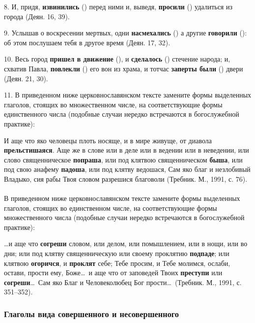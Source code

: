 \documentclass[11pt,a4paper,oneside]{memoir}
\newcommand{\exercise}{}
\begin{document}
8. И, придя, \textbf{извинились} ({}) перед ними и,
выведя, \textbf{просили} ({}) удалиться из города (Деян. 16, 39).

9. Услышав о воскресении мертвых, одни \textbf{насмехались}
({}) а другие \textbf{говорили} ({}): об
этом послушаем тебя в другое время (Деян. 17, 32).

10. Весь город \textbf{пришел в движение} ({}), и
\textbf{сделалось} ({}) стечение народа; и, схватив Павла,
\textbf{повлекли} ({}) его вон из храма, и тотчас
\textbf{заперты были} ({}) двери (Деян. 21, 30).

11. В приведенном ниже церковнославянском тексте замените формы
выделенных глаголов, стоящих во множественном числе, на
соответствующие формы единственного числа (подобные случаи нередко
встречаются в богослужебной практике):

И аще что яко человецы плоть носяще, и в мире живуще, от диавола
\textbf{прельстишаяся}. Аще же в слове или в деле или в ведении или в
неведении, или слово священническое \textbf{попраша}, или под клятвою
священническом \textbf{быша}, или под свою анафему \textbf{падоша},
или под клятву ведошася, Сам яко благ и незлобивый Владыко, сия рабы
Твоя словом разрешися благоволи (Требник. М., 1991, с. 76).

\paragraph{\exercise}

В приведенном ниже церковнославянском тексте замените формы
выделенных глаголов, стоящих во единственном числе, на
соответствующие формы множественного числа (подобные случаи нередко
встречаются в богослужебной практике):

\ldots и аще что \textbf{согреши} словом, или делом, или помышлением,
или в нощи, или во дни; или под клятву священническую или своему
проклятию \textbf{подпаде}; или клятвою \textbf{огоричся}, и
\textbf{проклят} себе; Тебе просим, и Тебе молимся, ослаби, остави,
прости ему, Боже\ldots~и аще что от заповедей Твоих \textbf{преступи}
или \textbf{согреши}\ldots~Сам яко Благ и Человеколюбец Бог
прости\ldots~(Требник. М., 1991, с. 351--352).

\subsubsection{Глаголы вида совершенного и несовершенного}
\end{document}
